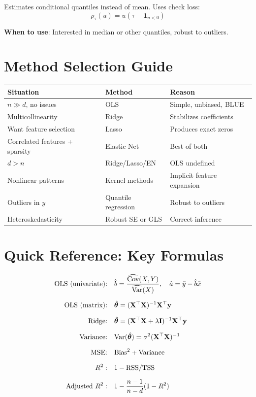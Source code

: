 \documentclass[main.tex]{subfiles}
\begin{document}
Estimates conditional quantiles instead of mean. Uses check loss:
$$\rho_\tau(u) = u(\tau - \mathbf{1}_{u < 0})$$

\textbf{When to use}: Interested in median or other quantiles, robust to outliers.

\section{Method Selection Guide}

\begin{center}
\small
\begin{tabular}{lll}
\hline
\textbf{Situation} & \textbf{Method} & \textbf{Reason} \\
\hline
$n \gg d$, no issues & OLS & Simple, unbiased, BLUE \\
Multicollinearity & Ridge & Stabilizes coefficients \\
Want feature selection & Lasso & Produces exact zeros \\
Correlated features + sparsity & Elastic Net & Best of both \\
$d > n$ & Ridge/Lasso/EN & OLS undefined \\
Nonlinear patterns & Kernel methods & Implicit feature expansion \\
Outliers in $y$ & Quantile regression & Robust to outliers \\
Heteroskedasticity & Robust SE or GLS & Correct inference \\
\hline
\end{tabular}
\end{center}

\section{Quick Reference: Key Formulas}

\begin{align*}
\text{OLS (univariate):} \quad & \hat{b} = \frac{\widehat{\text{Cov}}(X,Y)}{\widehat{\text{Var}}(X)}, \quad \hat{a} = \bar{y} - \hat{b}\bar{x} \\[6pt]
\text{OLS (matrix):} \quad & \hat{\boldsymbol{\theta}} = (\mathbf{X}^\top\mathbf{X})^{-1}\mathbf{X}^\top\mathbf{y} \\[6pt]
\text{Ridge:} \quad & \hat{\boldsymbol{\theta}} = (\mathbf{X}^\top\mathbf{X} + \lambda\mathbf{I})^{-1}\mathbf{X}^\top\mathbf{y} \\[6pt]
\text{Variance:} \quad & \text{Var}(\hat{\boldsymbol{\theta}}) = \sigma^2(\mathbf{X}^\top\mathbf{X})^{-1} \\[6pt]
\text{MSE:} \quad & \text{Bias}^2 + \text{Variance} \\[6pt]
R^2: \quad & 1 - \text{RSS}/\text{TSS} \\[6pt]
\text{Adjusted } R^2: \quad & 1 - \frac{n-1}{n-d}(1-R^2)
\end{align*}
\end{document}
